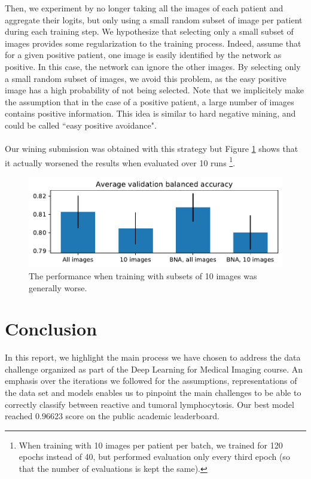 \documentclass[final]{cvpr}
\begin{document}
	\noindent
	Then, we experiment by no longer taking all the images of each patient and aggregate their logits, but only using a small random subset of image per patient during each training step. We hypothesize that selecting only a small subset of images provides some regularization to the training process. Indeed, assume that for a given positive patient, one image is easily identified by the network as positive. In this case, the network can ignore the other images. By selecting only a small random subset of images, we avoid this problem, as the easy positive image has a high probability of not being selected. Note that we implicitely make the assumption that in the case of a positive patient, a large number of images contains positive information. This idea is similar to hard negative mining, and could be called ``easy positive avoidance".\\
	\\
	Our wining submission was obtained with this strategy but Figure \ref{fig:num_img} shows that it actually worsened the results when evaluated over 10 runs \footnote{When training with 10 images per patient per batch, we trained for 120 epochs instead of 40, but performed evaluation only every third epoch (so that the number of evaluations is kept the same).}.
	
	\begin{figure}[t]
		\begin{center}
			\includegraphics[width=0.95\linewidth]{fig/num_img_bal_acc.pdf}
		\end{center}
		\caption{The performance when training with subsets of 10 images was generally worse.}
		\label{fig:num_img}
	\end{figure}

	
	\section{Conclusion}
	
	In this report, we highlight the main process we have chosen to address the data challenge organized as part of the Deep Learning for Medical Imaging course. An emphasis over the iterations we followed for the assumptions, representations of the data set and models enables us to pinpoint the main challenges to be able to correctly classify between reactive and tumoral lymphocytosis. Our best model reached $0.96623$ score on the public academic leaderboard.
	
	{\small
		
		
	}
\end{document}
